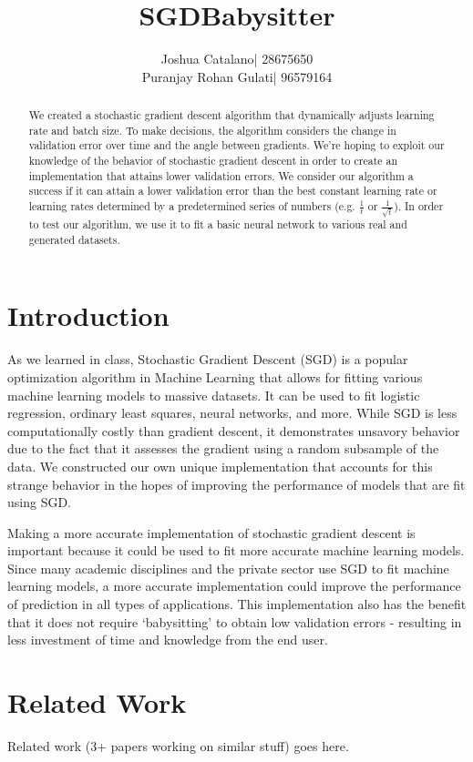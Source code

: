 \documentclass{article}
\title{SGDBabysitter}
\author{
	\begin{tabular}{rl}
			Joshua Catalano &|  28675650 \\
		Puranjay Rohan Gulati &|  96579164
	\end{tabular}
}
\begin{document}
 
 \maketitle 
 
 \begin{abstract} 
 	We created a stochastic gradient descent algorithm that dynamically adjusts learning rate and batch size. To make decisions, the algorithm considers the change in validation error over time and the angle between gradients. We're hoping to exploit our knowledge of the behavior of stochastic gradient descent in order to create an implementation that attains lower validation errors. We consider our algorithm a success if it can attain a lower validation error than the best constant learning rate or learning rates determined by a predetermined series of numbers (e.g. $\frac{1}{t}$ or $\frac{1}{\sqrt{t}}$). In order to test our algorithm, we use it to fit a basic neural network to various real and generated datasets. 
\end{abstract} 

\section*{Introduction} As we learned in class, Stochastic Gradient Descent (SGD) is a popular optimization algorithm in Machine Learning that allows for fitting various machine learning models to massive datasets. It can be used to fit logistic regression, ordinary least squares, neural networks, and more. While SGD is less computationally costly than gradient descent, it demonstrates unsavory behavior due to the fact that it assesses the gradient using a random subsample of the data. We constructed our own unique implementation that accounts for this strange behavior in the hopes of improving the performance of models that are fit using SGD. 
\par Making a more accurate implementation of stochastic gradient descent is important because it could be used to fit more accurate machine learning models. Since many academic disciplines and the private sector use SGD to fit machine learning models, a more accurate implementation could improve the performance of prediction in all types of applications. This implementation also has the benefit that it does not require `babysitting' to obtain low validation errors - resulting in less investment of time and knowledge from the end user. 

\section*{Related Work}
Related work (3+ papers working on similar stuff) goes here.
\end{document}
